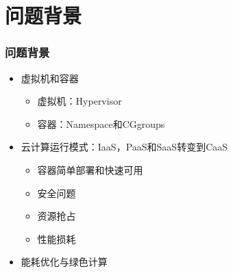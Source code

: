 \section{问题背景}

\begin{frame}
\frametitle{问题背景}
\begin{itemize}
    \item<1-> 虚拟机和容器
    \begin{itemize}
        \item<1-> 虚拟机：Hypervisor
        \item<1-> 容器：Namespace和CGgroups
    \end{itemize}
    \item<2-> 云计算运行模式：IaaS，PaaS和SaaS转变到CaaS
    \begin{itemize}
        \item<2-> 容器简单部署和快速可用
        \item<2-> 安全问题
        \item<2-> 资源抢占
        \item<2-> 性能损耗
    \end{itemize}
    \item<3-> 能耗优化与绿色计算
\end{itemize}


\end{frame}
